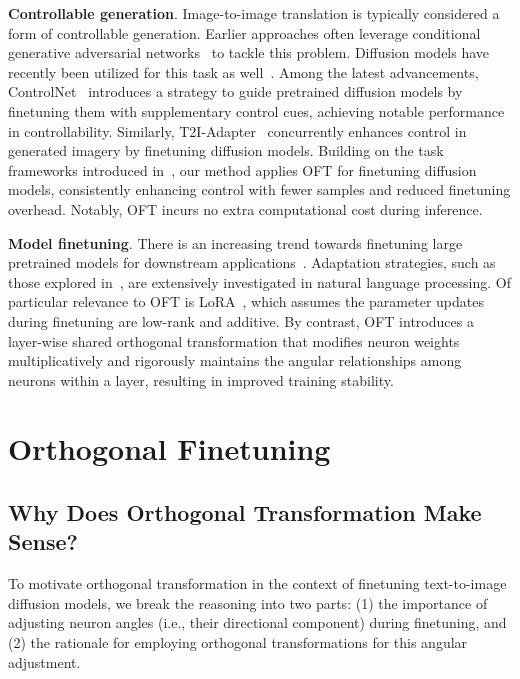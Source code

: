 \textbf{Controllable generation}. Image-to-image translation is typically considered a form of controllable generation. Earlier approaches often leverage conditional generative adversarial networks~\cite{isola2017image,zhu2017toward,wang2018high,park2019semantic,choi2018stargan} to tackle this problem. Diffusion models have recently been utilized for this task as well~\cite{saharia2022palette,voynov2022sketch,wang2022pretraining}. Among the latest advancements, ControlNet~\cite{zhang2023adding} introduces a strategy to guide pretrained diffusion models by finetuning them with supplementary control cues, achieving notable performance in controllability. Similarly, T2I-Adapter~\cite{mou2023t2i} concurrently enhances control in generated imagery by finetuning diffusion models. Building on the task frameworks introduced in~\cite{zhang2023adding,mou2023t2i}, our method applies OFT for finetuning diffusion models, consistently enhancing control with fewer samples and reduced finetuning overhead. Notably, OFT incurs no extra computational cost during inference.

\textbf{Model finetuning}. There is an increasing trend towards finetuning large pretrained models for downstream applications~\cite{devlin2018bert,brown2020language,he2022masked}. Adaptation strategies, such as those explored in~\cite{hulora2022,houlsby2019parameter,pfeiffer2020adapterfusion}, are extensively investigated in natural language processing. Of particular relevance to OFT is LoRA~\cite{hulora2022}, which assumes the parameter updates during finetuning are low-rank and additive. By contrast, OFT introduces a layer-wise shared orthogonal transformation that modifies neuron weights multiplicatively and rigorously maintains the angular relationships among neurons within a layer, resulting in improved training stability.

\section{Orthogonal Finetuning}

\subsection{Why Does Orthogonal Transformation Make Sense?}

To motivate orthogonal transformation in the context of finetuning text-to-image diffusion models, we break the reasoning into two parts: (1) the importance of adjusting neuron angles (i.e., their directional component) during finetuning, and (2) the rationale for employing orthogonal transformations for this angular adjustment.

